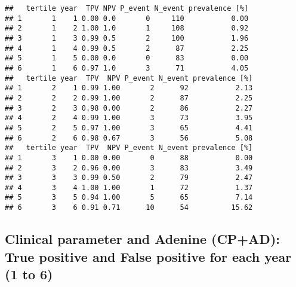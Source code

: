 \documentclass[
]{article}
\begin{document}
\begin{verbatim}
##   tertile year  TPV NPV P_event N_event prevalence [%]
## 1       1    1 0.00 0.0       0     110           0.00
## 2       1    2 1.00 1.0       1     108           0.92
## 3       1    3 0.99 0.5       2     100           1.96
## 4       1    4 0.99 0.5       2      87           2.25
## 5       1    5 0.00 0.0       0      83           0.00
## 6       1    6 0.97 1.0       3      71           4.05
##   tertile year  TPV  NPV P_event N_event prevalence [%]
## 1       2    1 0.99 1.00       2      92           2.13
## 2       2    2 0.99 1.00       2      87           2.25
## 3       2    3 0.98 0.00       2      86           2.27
## 4       2    4 0.99 1.00       3      73           3.95
## 5       2    5 0.97 1.00       3      65           4.41
## 6       2    6 0.98 0.67       3      56           5.08
##   tertile year  TPV  NPV P_event N_event prevalence [%]
## 1       3    1 0.00 0.00       0      88           0.00
## 2       3    2 0.96 0.00       3      83           3.49
## 3       3    3 0.99 0.50       2      79           2.47
## 4       3    4 1.00 1.00       1      72           1.37
## 5       3    5 0.94 1.00       5      65           7.14
## 6       3    6 0.91 0.71      10      54          15.62
\end{verbatim}

\hypertarget{clinical-parameter-and-adenine-cpad-true-positive-and-false-positive-for-each-year-1-to-6}{%
\subsection{Clinical parameter and Adenine (CP+AD): True positive and
False positive for each year (1 to
6)}\label{clinical-parameter-and-adenine-cpad-true-positive-and-false-positive-for-each-year-1-to-6}}
\end{document}
